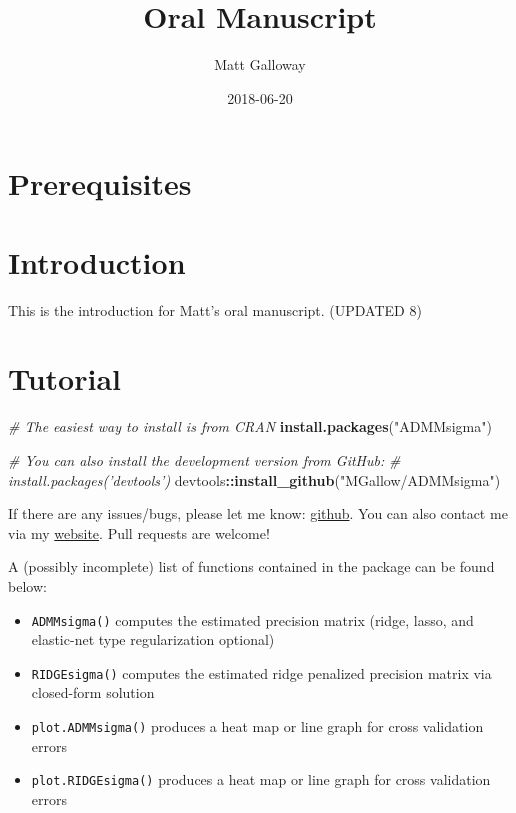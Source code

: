 \documentclass[11pt,]{book}
\title{Oral Manuscript}
\author{Matt Galloway}
\date{2018-06-20}
\newenvironment{Shaded}{\begin{snugshade}}{\end{snugshade}}
\newcommand{\CommentTok}[1]{\textcolor[rgb]{0.56,0.35,0.01}{\textit{#1}}}
\newcommand{\KeywordTok}[1]{\textcolor[rgb]{0.13,0.29,0.53}{\textbf{#1}}}
\newcommand{\NormalTok}[1]{#1}
\newcommand{\OperatorTok}[1]{\textcolor[rgb]{0.81,0.36,0.00}{\textbf{#1}}}
\newcommand{\StringTok}[1]{\textcolor[rgb]{0.31,0.60,0.02}{#1}}
\theoremstyle{definition}
\theoremstyle{definition}
\theoremstyle{definition}
\theoremstyle{remark}
\begin{document}
\maketitle

{
\hypersetup{linkcolor=}
\setcounter{tocdepth}{2}
\tableofcontents
}
\hypertarget{prerequisites}{%
\chapter{Prerequisites}\label{prerequisites}}

\hypertarget{intro}{%
\chapter{Introduction}\label{intro}}

This is the introduction for Matt's oral manuscript. (UPDATED 8)

\hypertarget{tutorial}{%
\chapter{Tutorial}\label{tutorial}}

\vspace{0.5cm}

\begin{Shaded}
\begin{Highlighting}[]
\CommentTok{# The easiest way to install is from CRAN}
\KeywordTok{install.packages}\NormalTok{(}\StringTok{"ADMMsigma"}\NormalTok{)}

\CommentTok{# You can also install the development version from GitHub:}
\CommentTok{# install.packages('devtools')}
\NormalTok{devtools}\OperatorTok{::}\KeywordTok{install_github}\NormalTok{(}\StringTok{"MGallow/ADMMsigma"}\NormalTok{)}
\end{Highlighting}
\end{Shaded}

\vspace{0.5cm}

If there are any issues/bugs, please let me know:
\href{https://github.com/MGallow/ADMMsigma/issues}{github}. You can also
contact me via my \href{https://mgallow.github.io/}{website}. Pull
requests are welcome!

\vspace{0.5cm}

A (possibly incomplete) list of functions contained in the package can
be found below:

\begin{itemize}
\item
  \texttt{ADMMsigma()} computes the estimated precision matrix (ridge,
  lasso, and elastic-net type regularization optional)
\item
  \texttt{RIDGEsigma()} computes the estimated ridge penalized precision
  matrix via closed-form solution
\item
  \texttt{plot.ADMMsigma()} produces a heat map or line graph for cross
  validation errors
\item
  \texttt{plot.RIDGEsigma()} produces a heat map or line graph for cross
  validation errors
\end{itemize}
\end{document}
